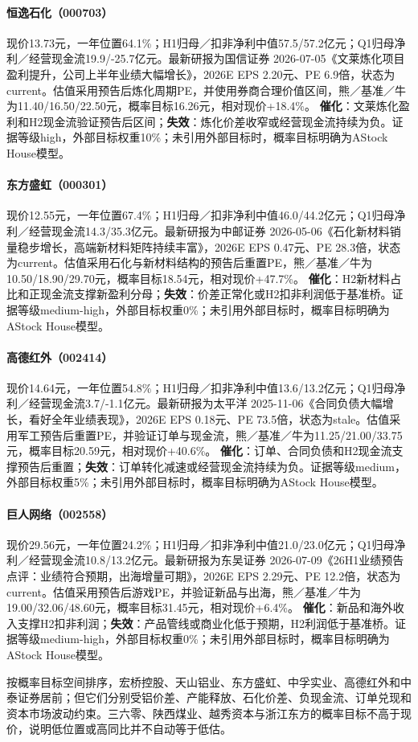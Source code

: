 \paragraph{恒逸石化（000703）}
现价13.73元，一年位置64.1\%；H1归母／扣非净利中值57.5/57.2亿元；Q1归母净利／经营现金流19.9/-25.7亿元。最新研报为国信证券 2026-07-05《文莱炼化项目盈利提升，公司上半年业绩大幅增长》，2026E EPS 2.20元、PE 6.9倍，状态为current。估值采用预告后炼化周期PE，并使用券商合理价值区间，熊／基准／牛为11.40/16.50/22.50元，概率目标16.26元，相对现价+18.4\%。
\textbf{催化}：文莱炼化盈利和H2现金流验证预告后区间；\textbf{失效}：炼化价差收窄或经营现金流持续为负。证据等级high，外部目标权重10\%；未引用外部目标时，概率目标明确为AStock House模型。

\paragraph{东方盛虹（000301）}
现价12.55元，一年位置67.4\%；H1归母／扣非净利中值46.0/44.2亿元；Q1归母净利／经营现金流14.3/35.3亿元。最新研报为中邮证券 2026-05-06《石化新材料销量稳步增长，高端新材料矩阵持续丰富》，2026E EPS 0.47元、PE 28.3倍，状态为current。估值采用石化与新材料结构的预告后重置PE，熊／基准／牛为10.50/18.90/29.70元，概率目标18.54元，相对现价+47.7\%。
\textbf{催化}：H2新材料占比和正现金流支撑新盈利分母；\textbf{失效}：价差正常化或H2扣非利润低于基准桥。证据等级medium-high，外部目标权重0\%；未引用外部目标时，概率目标明确为AStock House模型。

\paragraph{高德红外（002414）}
现价14.64元，一年位置54.8\%；H1归母／扣非净利中值13.6/13.2亿元；Q1归母净利／经营现金流3.7/-1.1亿元。最新研报为太平洋 2025-11-06《合同负债大幅增长，看好全年业绩表现》，2026E EPS 0.18元、PE 73.5倍，状态为stale。估值采用军工预告后重置PE，并验证订单与现金流，熊／基准／牛为11.25/21.00/33.75元，概率目标20.59元，相对现价+40.6\%。
\textbf{催化}：订单、合同负债和H2现金流支撑预告后重置；\textbf{失效}：订单转化减速或经营现金流持续为负。证据等级medium，外部目标权重5\%；未引用外部目标时，概率目标明确为AStock House模型。

\paragraph{巨人网络（002558）}
现价29.56元，一年位置24.2\%；H1归母／扣非净利中值21.0/23.0亿元；Q1归母净利／经营现金流10.8/13.2亿元。最新研报为东吴证券 2026-07-09《26H1业绩预告点评：业绩符合预期，出海增量可期》，2026E EPS 2.29元、PE 12.2倍，状态为current。估值采用预告后游戏PE，并验证新品与出海，熊／基准／牛为19.00/32.06/48.60元，概率目标31.45元，相对现价+6.4\%。
\textbf{催化}：新品和海外收入支撑H2扣非利润；\textbf{失效}：产品管线或商业化低于预期，H2利润低于基准桥。证据等级medium-high，外部目标权重0\%；未引用外部目标时，概率目标明确为AStock House模型。

\begin{keyinsight}[优先池的真正排序]
按概率目标空间排序，宏桥控股、天山铝业、东方盛虹、中孚实业、高德红外和中泰证券居前；但它们分别受铝价差、产能释放、石化价差、负现金流、订单兑现和资本市场波动约束。三六零、陕西煤业、越秀资本与浙江东方的概率目标不高于现价，说明低位置或高同比并不自动等于低估。
\end{keyinsight}
